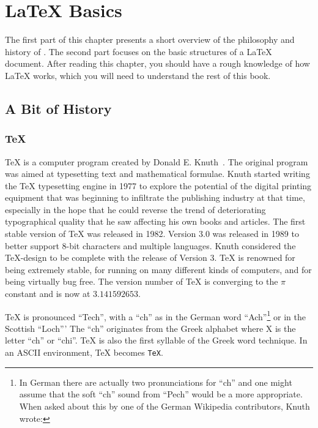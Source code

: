 \chapter{\LaTeX{} Basics}\label{chap:basics}
\begin{intro}
  The first part of this chapter presents a short
  overview of the philosophy and history of \LaTeXe. The second part
  focuses on the basic structures of a \LaTeX{} document.
  After reading this chapter, you should have a rough knowledge
  of how \LaTeX{} works, which you will need to understand the rest
  of this book.
\end{intro}

\section{A Bit of History}
\subsection{\TeX}

\TeX{} is a computer program created by Donald E. Knuth~\cite{texbook}. The original program was aimed at typesetting text and
mathematical formulae. Knuth started writing the \TeX{} typesetting engine in
1977 to explore the potential of the digital printing equipment that was
beginning to infiltrate the publishing industry at that time, especially in
the hope that he could reverse the trend of deteriorating typographical
quality that he saw affecting his own books and articles. The first stable
version of \TeX{} was released in 1982. Version 3.0 was released in 1989 to
better support 8-bit characters and multiple languages. Knuth considered the
\TeX-design to be complete with the release of Version 3. \TeX{} is renowned
for being extremely stable, for running on many different kinds of computers,
and for being virtually bug free. The version number of \TeX{} is converging
to the \(\pi\) constant and is now at \(3.141592653\).

\TeX{} is pronounced \enquote{Tech}, with a \enquote{ch} as in the German word
\enquote{Ach}\footnote{In German there are actually two pronunciations for
  \enquote{ch} and one might assume that the soft \enquote{ch} sound from
  \enquote{Pech} would be a more appropriate. When asked about this by one of the
  German Wikipedia contributors, Knuth wrote:
  } or in the
Scottish \enquote{Loch}' The \enquote{ch} originates from the Greek alphabet
where X is the letter \enquote{ch} or \enquote{chi}. \TeX{} is also the first
syllable of the Greek word technique. In an ASCII environment, \TeX{} becomes
\texttt{TeX}.

